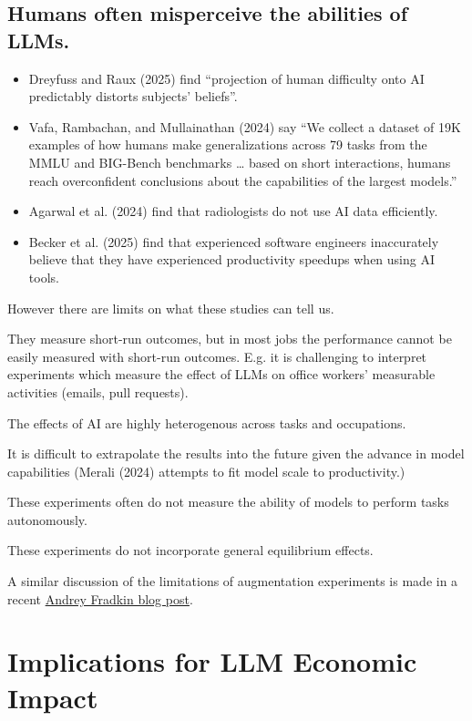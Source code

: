 \documentclass[
  letterpaper,
  DIV=11,
  numbers=noendperiod,
  oneside]{scrartcl}
\begin{document}
\subsection{Humans often misperceive the abilities of
LLMs.}\label{humans-often-misperceive-the-abilities-of-llms.}

\begin{itemize}
\item
  Dreyfuss and Raux (2025) find ``projection of human difficulty onto AI
  predictably distorts subjects' beliefs''.
\item
  Vafa, Rambachan, and Mullainathan (2024) say ``We collect a dataset of
  19K examples of how humans make generalizations across 79 tasks from
  the MMLU and BIG-Bench benchmarks \ldots{} based on short
  interactions, humans reach overconfident conclusions about the
  capabilities of the largest models.''
\item
  Agarwal et al. (2024) find that radiologists do not use AI data
  efficiently.
\item
  Becker et al. (2025) find that experienced software engineers
  inaccurately believe that they have experienced productivity speedups
  when using AI tools.
\end{itemize}

However there are limits on what these studies can tell us.

They measure short-run outcomes, but in most jobs the performance cannot
be easily measured with short-run outcomes. E.g. it is challenging to
interpret experiments which measure the effect of LLMs on office
workers' measurable activities (emails, pull requests).

The effects of AI are highly heterogenous across tasks and occupations.

It is difficult to extrapolate the results into the future given the
advance in model capabilities (Merali (2024) attempts to fit model scale
to productivity.)

These experiments often do not measure the ability of models to perform
tasks autonomously.

These experiments do not incorporate general equilibrium effects.

A similar discussion of the limitations of augmentation experiments is
made in a recent
\href{https://empiricrafting.substack.com/p/sci-fi-economics?r=365z3v&utm_campaign=post&utm_medium=web&triedRedirect=true}{Andrey
Fradkin blog post}.

\section{Implications for LLM Economic
Impact}\label{implications-for-llm-economic-impact}
\end{document}
